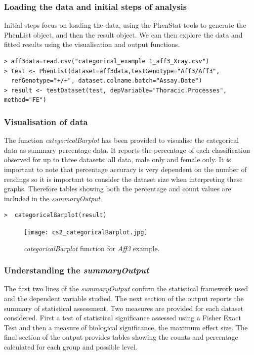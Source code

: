 \documentclass[12pt,a4paper]{article}
\begin{document}
\subsubsection{Loading the data and initial steps of analysis}
Initial steps focus on loading the data, using the PhenStat tools to generate the PhenList object, and then the result object.  We can then explore the data and fitted results using the visualisation and output functions.   

\begingroup
    \fontsize{8pt}{12pt}\selectfont
\begin{verbatim}
> aff3data=read.csv("categorical_example 1_aff3_Xray.csv")
> test <- PhenList(dataset=aff3data,testGenotype="Aff3/Aff3", 
  refGenotype="+/+", dataset.colname.batch="Assay.Date")
> result <- testDataset(test, depVariable="Thoracic.Processes", method="FE")
\end{verbatim}
\endgroup 

\subsubsection{Visualisation of data}
The function \textit{categoricalBarplot} has been provided to visualise the categorical data as summary percentage data. 
It reports the percentage of each classification observed for up to three datasets: all data, male only and female only.  
It is important to note that percentage accuracy is very dependent on the number of readings so it is important to consider the dataset size when interpreting these graphs.  
Therefore tables showing both the percentage and count values are included in the \textit{summaryOutput}. 

\begingroup
    \fontsize{8pt}{12pt}\selectfont
\begin{verbatim}
>  categoricalBarplot(result)
\end{verbatim}
\endgroup 

\begin{figure}[H]%
\centerline{\texttt{[image: cs2\_categoricalBarplot.jpg]}}
\caption{\textit{categoricalBarplot} function for \textit{Aff3} example.}\label{fig:24}
\end{figure}

\subsubsection{Understanding the \textit{summaryOutput}}

The first two lines of the \textit{summaryOutput} confirm the statistical framework used and the dependent variable studied.  
The next section of the output reports the summary of statistical assessment. Two measures are provided for each dataset considered. 
First a test of statistical significance assessed using a Fisher Exact Test and then a measure of biological significance, the maximum effect size. 
The final section of the output provides tables showing the counts and percentage calculated for each group and possible level. 
\end{document}
